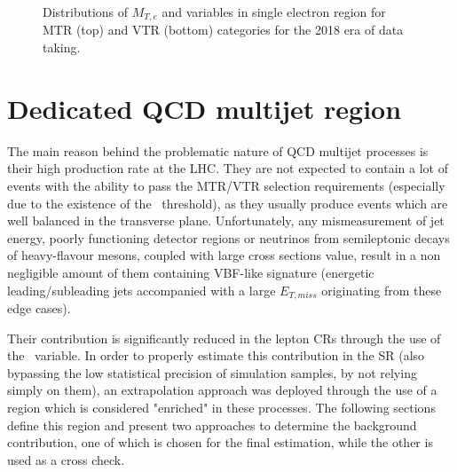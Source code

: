\begin{figure}[htbp]
{    }
  \caption{Distributions of $M_{T,e}$ and \mindphinoe variables in single electron region for MTR (top) and VTR (bottom) categories for the 2018 era of data taking.}
  \label{fig:2018_Wenu_2}
\end{figure}





\section{Dedicated QCD multijet region}

\hspace{10pt} The main reason behind the problematic nature of QCD multijet processes is their high production rate at the LHC. They are not expected to contain a lot of events with the ability to pass the MTR/VTR selection requirements (especially due to the existence of the \mindphi~threshold), as they usually produce events which are well balanced in the transverse plane. Unfortunately, any mismeasurement of jet energy, poorly functioning detector regions or neutrinos from semileptonic decays of heavy-flavour mesons, coupled with large cross sections value, result in a non negligible amount of them containing VBF-like signature (energetic leading/subleading jets accompanied with a large $E_{T,miss}$ originating from these edge cases). 

\hspace{10pt} Their contribution is significantly reduced in the lepton CRs through the use of the \mindphi~variable. In order to properly estimate this contribution in the SR (also bypassing the low statistical precision of simulation samples, by not relying simply on them), an extrapolation approach was deployed through the use of a region which is considered "enriched" in these processes. The following sections define this region and present two approaches to determine the background contribution, one of which is chosen for the final estimation, while the other is used as a cross check.

